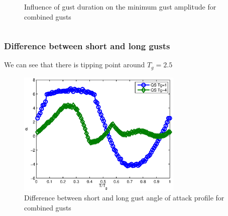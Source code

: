\documentclass[compress]{beamer}
\begin{document}
\begin{frame}
\begin{columns}
\begin{figure}[h!]
\begin{center}
      \end{center}
      \caption{Influence of gust duration on the minimum gust amplitude for combined gusts}
      \label{fig:combined_amplitude_duration}
    \end{figure}
  \end{columns} %
\end{frame}

\begin{frame}
  \frametitle{Difference between short and long gusts}
  We can see that there is tipping point around $T_g=2.5$
  \begin{figure}[h]
    \centering
    \includegraphics[width=0.7\textwidth]{./Figures/alpha_vs_Tg_QS_short_vs_long_wt3.eps}
    \caption{Difference between short and long gust angle of attack profile for combined gusts}
    \label{fig:short_vs_long_qs_wt=3}
  \end{figure}
\end{frame}
\end{document}
